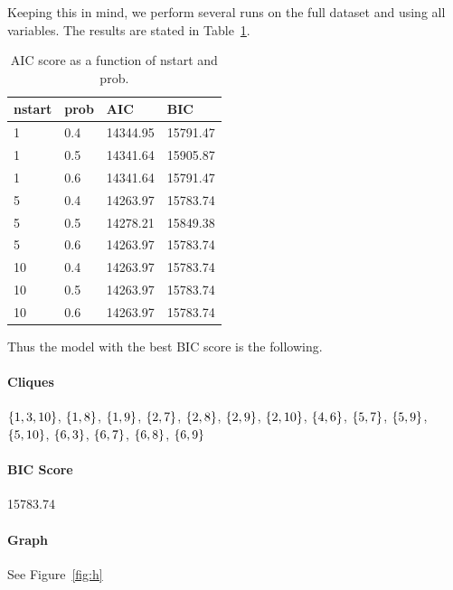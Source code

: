 \documentclass[12pt]{article}
\theoremstyle{definition}
\begin{document}
Keeping this in mind, we perform several runs on the full dataset and using all variables.
The results are stated in Table~\ref{table1}.

\begin{table}[H]
\centering
\begin{tabular}{llll}
    nstart & prob & AIC & BIC \\
    \hline \hline
    1 & 0.4 & 14344.95 & 15791.47 \\
    1 & 0.5 & 14341.64 & 15905.87 \\
    1 & 0.6 & 14341.64 & 15791.47 \\
    5 & 0.4 & 14263.97 & 15783.74 \\
    5 & 0.5 & 14278.21 & 15849.38 \\
    5 & 0.6 & 14263.97 & 15783.74 \\
    10 & 0.4 & 14263.97 & 15783.74 \\
    10 & 0.5 & 14263.97 & 15783.74 \\
    10 & 0.6 & 14263.97 & 15783.74 \\
\end{tabular}
\caption{AIC score as a function of nstart and prob.}
\label{table1}
\end{table}

Thus the model with the best BIC score is the following.
\paragraph{Cliques}
$\set{1,3,10}$, $\set{1,8}$, $\set{1,9}$, $\set{2,7}$, $\set{2,8}$, $\set{2,9}$,
$\set{2,10}$, $\set{4,6}$, $\set{5,7}$, $\set{5,9}$, $\set{5,10}$, $\set{6,3}$,
$\set{6,7}$, $\set{6,8}$, $\set{6,9}$

\paragraph{BIC Score} 15783.74

\paragraph{Graph} See Figure~\ref{fig:h}
\end{document}
